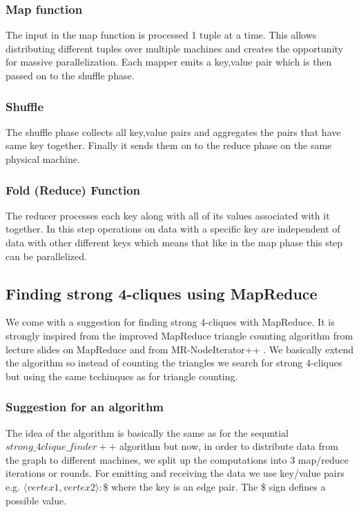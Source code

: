\documentclass{article}
\begin{document}
\subsubsection{Map function}
The input in the map function is processed 1 tuple at a time. This allows distributing different tuples over multiple machines and creates the opportunity for massive parallelization. Each mapper emits a key,value pair which is then passed on to the shuffle phase.

\subsubsection{Shuffle}
The shuffle phase collects all key,value pairs and aggregates the pairs that have same key together. Finally it sends them on to the reduce phase on the same physical machine.

\subsubsection{Fold (Reduce) Function}
The reducer processes each key along with all of its values associated with it together. In this step operations on data with a specific key are independent of data with other different keys which means that like in the map phase this step can be parallelized.

\subsection{Finding strong 4-cliques using MapReduce}
We come with a suggestion for finding strong 4-cliques with MapReduce. It is strongly inspired from the improved MapReduce triangle counting algorithm from lecture slides on MapReduce \cite{lnMapReduce} and from MR-NodeIterator++ \cite{countingTriangles}. We basically extend the algorithm so instead of counting the triangles we search for strong 4-cliques but using the same techinques as for triangle counting.

\subsubsection{Suggestion for an algorithm}
The idea of the algorithm is basically the same as for the sequntial $strong\_4clique\_finder++$ algorithm but now, in order to distribute data from the graph to different machines, we split up the computations into 3 map/reduce iterations or rounds. For emitting and receiving the data we use key/value pairs e.g. $\langle vertex1,vertex2\rangle :\$$ where the key is an edge pair. The $\$$ sign defines a possible value.
\end{document}
